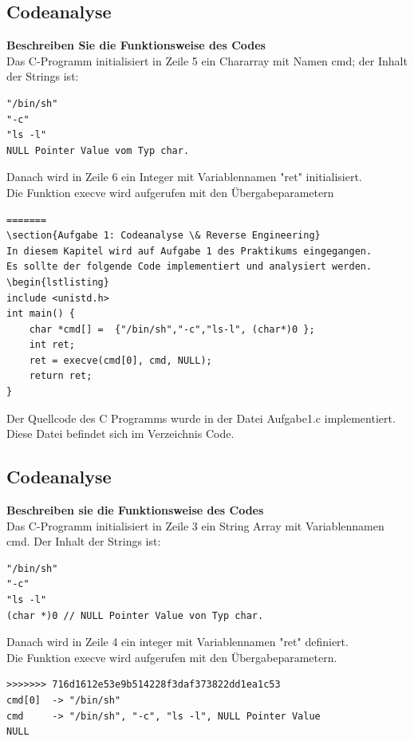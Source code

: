\documentclass[12pt]{article}
\begin{document}
		\subsection{Codeanalyse}
		\textbf{Beschreiben Sie die Funktionsweise des Codes}\\
			Das C-Programm initialisiert in Zeile 5 ein Chararray mit Namen cmd; der Inhalt der Strings ist: \\
			\begin{lstlisting}
"/bin/sh"
"-c"
"ls -l"
NULL Pointer Value vom Typ char.
			\end{lstlisting}
			Danach wird in Zeile 6 ein Integer mit Variablennamen "ret" initialisiert.\\
			Die Funktion execve wird aufgerufen mit den \"Ubergabeparametern
			\begin{lstlisting}
=======
\section{Aufgabe 1: Codeanalyse \& Reverse Engineering}
In diesem Kapitel wird auf Aufgabe 1 des Praktikums eingegangen.
Es sollte der folgende Code implementiert und analysiert werden.
\begin{lstlisting}
include <unistd.h>
int main() {
	char *cmd[] =  {"/bin/sh","-c","ls-l", (char*)0 };
	int ret;
	ret = execve(cmd[0], cmd, NULL);
	return ret;
}
\end{lstlisting}

Der Quellcode des C Programms wurde in der Datei Aufgabe1.c implementiert.
Diese Datei befindet sich im Verzeichnis Code.

\subsection{Codeanalyse}
\textbf{Beschreiben sie die Funktionsweise des Codes}\\
Das C-Programm initialisiert in Zeile 3 ein String Array mit Variablennamen cmd. 
Der Inhalt der Strings ist: \\
\begin{lstlisting}
"/bin/sh"
"-c"
"ls -l"
(char *)0 // NULL Pointer Value von Typ char.
\end{lstlisting}
Danach wird in Zeile 4 ein integer mit Variablennamen "ret" definiert.\\
Die Funktion execve wird aufgerufen mit den Übergabeparametern.
\begin{lstlisting}
>>>>>>> 716d1612e53e9b514228f3daf373822dd1ea1c53
cmd[0] 	-> "/bin/sh"
cmd		-> "/bin/sh", "-c", "ls -l", NULL Pointer Value
NULL
			\end{lstlisting}
\end{document}
